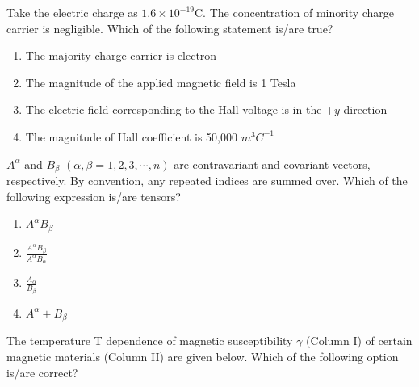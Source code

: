 Take the electric charge as $1.6\times10^{-19}$C. The concentration of minority charge
carrier is negligible. Which of the following statement is/are true?
\begin{enumerate}
    \item The majority charge carrier is electron
    \item The magnitude of the applied magnetic field is 1 Tesla
    \item The electric field corresponding to the Hall voltage is in the +$y$ direction
    \item The magnitude of Hall coefficient is 50,000 $m^3C^{-1}$
\end{enumerate}
\item $A^\alpha$ and $B_\beta$ $(\alpha,\beta=1,2,3,\cdots,n)$ are contravariant and covariant vectors,
respectively. By convention, any repeated indices are summed over. Which of the
following expression is/are tensors?
\begin{enumerate}
    \item $A^\alpha B_\beta$
    \item $\frac{A^\alpha B_\beta}{A^\alpha B_\alpha}$
    \item $\frac{A_\alpha}{B_\beta}$
    \item $A^\alpha+ B_\beta$
\end{enumerate}
\item The temperature T dependence of magnetic susceptibility $\gamma$ (Column I) of certain
magnetic materials (Column II) are given below. Which of the following option
is/are correct? \\
